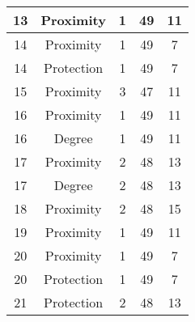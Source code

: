 \documentclass[results.tex]{subfiles}
\begin{document}
\begin{center}
\begin{tabular}{| c || c | c | c | c |}
            \hline
            13                      & Proximity                    & 1                      & 49                      & 11                   \\
            \hline
            14                      & Proximity                    & 1                      & 49                      & 7                    \\
            \hline
            14                      & Protection                   & 1                      & 49                      & 7                    \\
            \hline
            15                      & Proximity                    & 3                      & 47                      & 11                   \\
            \hline
            16                      & Proximity                    & 1                      & 49                      & 11                   \\
            \hline
            16                      & Degree                       & 1                      & 49                      & 11                   \\
            \hline
            17                      & Proximity                    & 2                      & 48                      & 13                   \\
            \hline
            17                      & Degree                       & 2                      & 48                      & 13                   \\
            \hline
            18                      & Proximity                    & 2                      & 48                      & 15                   \\
            \hline
            19                      & Proximity                    & 1                      & 49                      & 11                   \\
            \hline
            20                      & Proximity                    & 1                      & 49                      & 7                    \\
            \hline
            20                      & Protection                   & 1                      & 49                      & 7                    \\
            \hline
            21                      & Protection                   & 2                      & 48                      & 13                   \\

\end{tabular}
\end{center}
\end{document}
